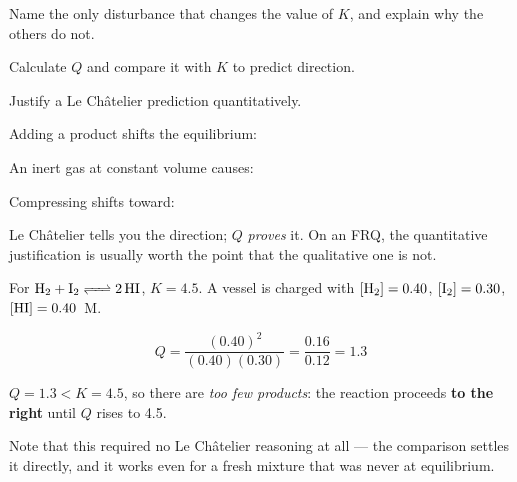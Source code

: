 \documentclass{apchem-notes}
\begin{document}
\begin{exitticket}
Name the only disturbance that changes the value of $K$, and explain why
the others do not.
\end{exitticket}


\begin{objectives}
  \item Calculate $Q$ and compare it with $K$ to predict direction.
  \item Justify a Le Ch\^atelier prediction quantitatively.
\end{objectives}


\begin{warmup}[3]
  \item Adding a product shifts the equilibrium:
  \item An inert gas at constant volume causes:
  \item Compressing shifts toward:
\end{warmup}



Le Ch\^atelier tells you the direction; $Q$ \emph{proves} it. On an FRQ,
the quantitative justification is usually worth the point that the
qualitative one is not.

\begin{workedexample}
For $\ce{H2 + I2 <=> 2HI}$, $K = 4.5$. A vessel is charged with
$[\ce{H2}] = 0.40$, $[\ce{I2}] = 0.30$, $[\ce{HI}] = 0.40$~M.

\[ Q = \frac{(0.40)^2}{(0.40)(0.30)} = \frac{0.16}{0.12} = 1.3 \]

$Q = 1.3 < K = 4.5$, so there are \emph{too few products}: the reaction
proceeds \textbf{to the right} until $Q$ rises to 4.5.

Note that this required no Le Ch\^atelier reasoning at all --- the
comparison settles it directly, and it works even for a fresh mixture that
was never at equilibrium.
\end{workedexample}
\end{document}
